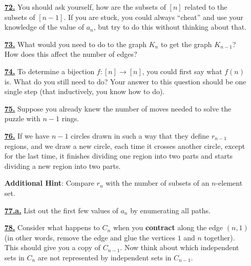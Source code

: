 \documentclass[10pt,]{book}
\newcommand{\terminology}[1]{\textbf{#1}}
\theoremstyle{plain}
\theoremstyle{definition}
\theoremstyle{definition}
\theoremstyle{definition}
\numberwithin{equation}{chapter}
\begin{document}
\begin{itemize}[itemsep=1em]
\hypertarget{a-72}{}\item[\textbf{\hyperref[activity-72]{72.}}]
\hypertarget{p-462}{}%
You should ask yourself, how are the subsets of \([n]\) related to the subsets of \([n-1]\).  If you are stuck, you could always ``cheat'' and use your knowledge of the value of \(a_n\), but try to do this without thinking about that.%

\hypertarget{a-73}{}\item[\textbf{\hyperref[activity-73]{73.}}]
\hypertarget{p-464}{}%
What would you need to do to the graph \(K_n\) to get the graph \(K_{n-1}\)?  How does this affect the number of edges?%

\hypertarget{a-74}{}\item[\textbf{\hyperref[activity-74]{74.}}]
\hypertarget{p-466}{}%
To determine a bijection \(f:[n] \to [n]\), you could first say what \(f(n)\) is.  What do you still need to do?  Your answer to this question should be one single step (that inductively, you know how to do).%

\hypertarget{a-75}{}\item[\textbf{\hyperref[HanoiProblem]{75.}}]
\hypertarget{p-468}{}%
Suppose you already knew the number of moves needed to solve the puzzle with \(n-1\) rings.%

\hypertarget{a-76}{}\item[\textbf{\hyperref[circlesinplane]{76.}}]
\hypertarget{p-471}{}%
If we have \(n - 1\) circles drawn in such a way that they define \(r_{n-1}\) regions, and we draw a new circle, each time it crosses another circle, except for the last time, it finishes dividing one region into two parts and starts dividing a new region into two parts.%

\par\smallskip
\noindent\textbf{Additional Hint}: \hypertarget{p-472}{}%
Compare \(r_n\) with the number of subsets of an \(n\)-element set.%

\hypertarget{a-77.a}{}\item[\textbf{\hyperref[task-102]{77.a.}}]
\hypertarget{p-478}{}%
List out the first few values of \(a_n\) by enumerating all paths.%

\hypertarget{a-78}{}\item[\textbf{\hyperref[activity-78]{78.}}]
\hypertarget{p-481}{}%
Consider what happens to \(C_n\) when you \terminology{contract} along the edge \((n,1)\) (in other words, remove the edge and glue the vertices \(1\) and \(n\) together).  This should give you a copy of \(C_{n-1}\).  Now think about which independent sets in \(C_n\) are not represented by independent sets in \(C_{n-1}\).%


\end{itemize}
\end{document}
